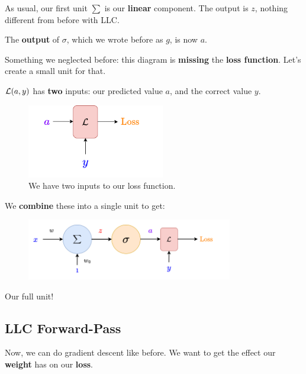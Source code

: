         As usual, our first unit $\sum$ is our \textbf{linear} component. The output is $z$, nothing different from before with LLC.
        
        The \textbf{output} of $\sigma$, which we wrote before as $g$, is now $a$.
        
        Something we neglected before: this diagram is \textbf{missing} the \textbf{loss function}. Let's create a small unit for that. 
        
        $\mathcal{L}(a,y)$ has \textbf{two} inputs: our predicted value $a$, and the correct value $y$. 
        
        \begin{figure}[H]
            \centering
            \includegraphics[width=60mm,scale=0.4]{images/nn_2_images/loss_unit.png}
            \caption*{We have two inputs to our loss function.}
        \end{figure}
        
        We \textbf{combine} these into a single unit to get:
        
        \begin{figure}[H]
            \centering
            \includegraphics[width=90mm,scale=0.4]{images/nn_2_images/llc_as_neuron_loss.png}
        \end{figure}
        
        Our full unit!
        
    \phantom{}
    
    \subsection{LLC Forward-Pass}
    
        Now, we can do gradient descent like before. We want to get the effect our \textbf{weight} has on our \textbf{loss}.
        
